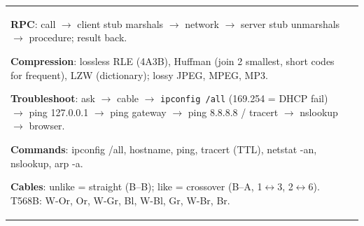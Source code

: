 \documentclass[10pt]{article}
\begin{document}
\begin{cheatsheet}
\begin{tabularx}{\linewidth}{@{}XX@{}}
\textbf{RPC}: call $\to$ client stub marshals $\to$ network $\to$ server stub unmarshals $\to$ procedure; result back.

\textbf{Compression}: lossless RLE (4A3B), Huffman (join 2 smallest, short codes for frequent), LZW (dictionary); lossy JPEG, MPEG, MP3.

\textbf{Troubleshoot}: ask $\to$ cable $\to$ \texttt{ipconfig /all} (169.254 = DHCP fail) $\to$ ping 127.0.0.1 $\to$ ping gateway $\to$ ping 8.8.8.8 / tracert $\to$ nslookup $\to$ browser.

\textbf{Commands}: ipconfig /all, hostname, ping, tracert (TTL), netstat -an, nslookup, arp -a.

\textbf{Cables}: unlike = straight (B--B); like = crossover (B--A, 1$\leftrightarrow$3, 2$\leftrightarrow$6). T568B: W-Or, Or, W-Gr, Bl, W-Bl, Gr, W-Br, Br.
\end{tabularx}
\end{cheatsheet}
\end{document}
